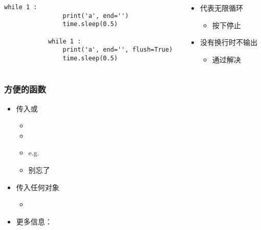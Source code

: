 \begin{CJK}{UTF8}{gbsn}
\begin{frame} [fragile]
\begin{columns}[T]
\begin{column}[T]{.5\textwidth}
\begin{lstlisting}[style=pythonstyle, gobble=12]
			while 1 :
				print('a', end='')
				time.sleep(0.5)

			while 1 :
				print('a', end='', flush=True)
				time.sleep(0.5)
			\end{lstlisting}
		\end{column}
		\begin{column}[T]{.5\textwidth}
			\linespread{2}
			\begin{itemize}
			\item {} 代表无限循环
				\begin{itemize}
				\item 按下停止
				\end{itemize}
			\item 没有换行时不输出
				\begin{itemize}
				\item 通过解决
				\end{itemize}
			\end{itemize}
		\end{column}
	\end{columns}
\end{frame}

\begin{frame} [fragile]
	\frametitle{方便的函数}
	\linespread{1.25}
	\begin{itemize}
	\item 传入或
		\begin{itemize}
		\item {}
		\item {}
		\item e.g. 
		\item 别忘了
		\end{itemize}
	\item 传入任何对象
		\begin{itemize}
		\item {}
		\end{itemize}
	\item 更多信息：
	\end{itemize}
\end{frame}


\end{CJK}
